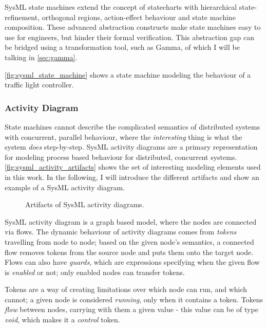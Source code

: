 SysML state machines extend the concept of statecharts with hierarchical state-refinement, orthogonal regions, action-effect behaviour and state machine composition. These advanced abstraction constructs make state machines easy to use for engineers, but hinder their formal verification. This abstraction gap can be bridged using a transformation tool, such as Gamma, of which I will be talking in \autoref{sec:gamma}.

\autoref{fig:sysml_state_machine} shows a state machine modeling the behaviour of a traffic light controller.

\subsubsection{Activity Diagram}\label{ssec:sysml_activity}

State machines cannot describe the complicated semantics of distributed systems with concurrent, parallel behaviour, where the \emph{interesting} thing is what the system \emph{does} step-by-step. SysML activity diagrams are a primary representation for modeling process based behaviour \cite{omg_sysml} for distributed, concurrent systems. \autoref{fig:sysml_activity_artifacts} shows the set of interesting modeling elements used in this work. In the following, I will introduce the different artifacts and show an example of a SysML activity diagram.

\begin{figure}[!ht]
	\centering
	
	\caption{Artifacts of SysML activity diagrams.}
	\label{fig:sysml_activity_artifacts}
\end{figure}

SysML activity diagram is a graph based model, where the nodes are connected via flows. The dynamic behaviour of activity diagrams comes from \emph{tokens} travelling from node to node; based on the given node's semantics, a connected flow removes tokens from the source node and puts them onto the target node. Flows can also have \emph{guards}, which are expressions specifying when the given flow is \emph{enabled} or not; only enabled nodes can transfer tokens.

Tokens are a way of creating limitations over which node can run, and which cannot; a given node is considered \emph{running}, only when it contains a token. Tokens \emph{flow} between nodes, carrying with them a given value - this value can be of type \emph{void}, which makes it a \emph{control} token.

